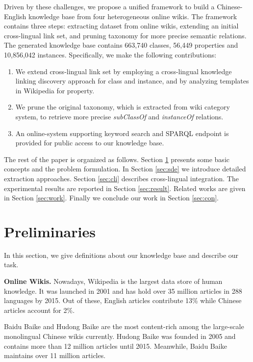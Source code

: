 \documentclass[runningheads,a4paper]{llncs}
\newcommand{\para}[1]{\vspace{0.1cm}\noindent\textbf{#1}}
\begin{document}
Driven by these challenges, we propose a unified framework to build a Chinese-English knowledge base from four heterogeneous online wikis. The framework contains three steps: extracting dataset from online wikis, extending an initial cross-lingual link set, and pruning taxonomy for more precise semantic relations. The generated knowledge base contains 663,740 classes, 56,449 properties and 10,856,042 instances. Specifically, we make the following contributions:
\begin{enumerate}
  \item We extend cross-lingual link set by employing a cross-lingual knowledge linking discovery approach for class and instance, and by analyzing templates in Wikipedia for property.
  \item We prune the original taxonomy, which is extracted from wiki category system, to retrieve more precise \textit{subClassOf} and \textit{instanceOf} relations.
  \item An online-system supporting keyword search and SPARQL endpoint is provided for public access to our knowledge base.
\end{enumerate}

The rest of the paper is organized as follows. Section \ref{sec:pd} presents some basic concepts and the problem formulation. In Section \ref{sec:sde} we introduce detailed extraction approaches. Section \ref{sec:cli} describes cross-lingual integration. The experimental results are reported in Section \ref{sec:result}. Related works are given in Section \ref{sec:work}. Finally we conclude our work in Section \ref{sec:con}.

\section{Preliminaries}
\label{sec:pd}
In this section, we give definitions about our knowledge base and describe our task.

\para{Online Wikis.} Nowadays, Wikipedia is the largest data store of human knowledge. It was launched in 2001 and has hold over 35 million articles in 288 languages by 2015. Out of these, English articles contribute 13\% while Chinese articles account for 2\%. 

Baidu Baike and Hudong Baike are the most content-rich among the large-scale monolingual Chinese wikis currently. Hudong Baike was founded in 2005 and contains more than 12 million articles until 2015. Meanwhile, Baidu Baike maintains over 11 million articles.
\end{document}
